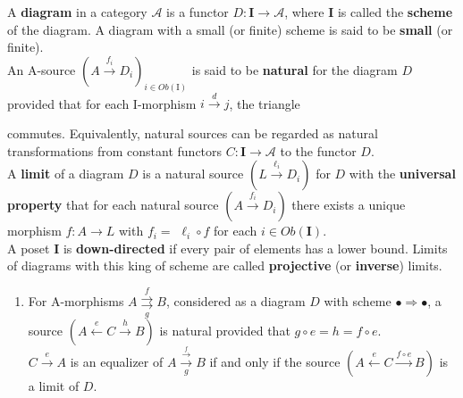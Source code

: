  A \textbf{diagram} in a category $\mathcal{A}$ is a functor $D: \mathbf{I} \rightarrow \mathcal{A}$, where $\mathbf{I}$ is called the \textbf{scheme} of the diagram. A diagram with a small (or finite) scheme is said to be \textbf{small} (or finite).\\
An A-source $\left(A \xrightarrow{f_i} D_i\right)_{i \in O b(\mathrm{I})}$ is said to be \textbf{natural} for the diagram $D$ provided that for each I-morphism $i \xrightarrow{d} j$, the triangle 
 commutes. Equivalently, natural sources can be regarded as natural transformations from constant functors $C: \mathbf{I} \rightarrow \mathcal{A}$ to the functor $D$.\\
A \textbf{limit} of a diagram $D$ is a natural source $\left(L \xrightarrow{\ell_i} D_i\right)$ for $D$ with the \textbf{universal property} that for each natural source $\left(A \xrightarrow{f_i} D_i\right)$ there exists a unique morphism $f: A \rightarrow L$ with $f_i=$ $\ell_i \circ f$ for each $i \in O b(\mathbf{I})$.\\
 A poset $\mathbf{I}$ is \textbf{down-directed} if every pair of elements has a lower bound. Limits of diagrams with this king of scheme are called \textbf{projective} (or \textbf{inverse}) limits. 


\begin{prop}
    
\begin{enumerate}

    \item For A-morphisms $A \underset{g}{\stackrel{f}{\rightrightarrows}} B$, considered as a diagram $D$ with scheme $\bullet \Rightarrow \bullet$, a source $(A \stackrel{e}{\longleftarrow} C \xrightarrow{h} B)$ is natural provided that $g \circ e=h=f \circ e$.\\
    $C \xrightarrow{e} A$ is an equalizer of $A \xrightarrow[g]{\stackrel{f}{\longrightarrow}} B$ if and only if the source $(A \stackrel{e}{\leftarrow} C \xrightarrow{f \circ e} B)$ is a limit of $D$. 
\end{enumerate}
\end{prop}

